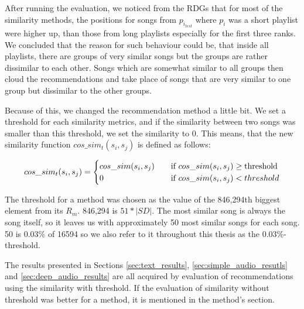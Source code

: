 After running the evaluation, we noticed from the RDGs that for most of the similarity methods, the positions for songs from $p_{i_{test}} $ where $p_i$ was a short playlist were higher up, than those from long playlists especially for the first three ranks. We concluded that the reason for such behaviour could be, that inside all playlists, there are groups of very similar songs but the groups are rather dissimilar to each other. Songs which are somewhat similar to all groups then cloud the recommendations and take place of songs that are very similar to one group but dissimilar to the other groups.

Because of this, we changed the recommendation method a little bit. We set a threshold for each similarity metrics, and if the similarity between two songs was smaller than this threshold, we set the similarity to 0. This means, that the new similarity function $cos\_sim_t(s_i,s_j)$ is defined as follows:

\[   
cos\_sim_t(s_i,s_j) = 
     \begin{cases}
       \text{$ cos\_sim(s_i,s_j) $} &\quad\text{if $ cos\_sim(s_i,s_j)$} \geq \text{threshold}\\
       \text{$ 0 $} &\quad\text{if $ cos\_sim(s_i,s_j)  < threshold$}\\
     \end{cases}
\]

 The threshold for a method was chosen as the value of the 846,294th biggest element from its $R_m$. 846,294 is $ 51 * |SD| $. The most similar song is always the song itself, so it leaves us with approximately 50 most similar songs for each song. 50 is 0.03\% of 16594 so we also refer to it throughout this thesis as the 0.03\%-threshold. 
 
The results presented in Sections \ref{sec:text_results}, \ref{sec:simple_audio_resutls} and \ref{sec:deep_audio_results} are all acquired by evaluation of recommendations using the similarity with threshold. If the evaluation of similarity without threshold was better for a method, it is mentioned in the method's section. 

